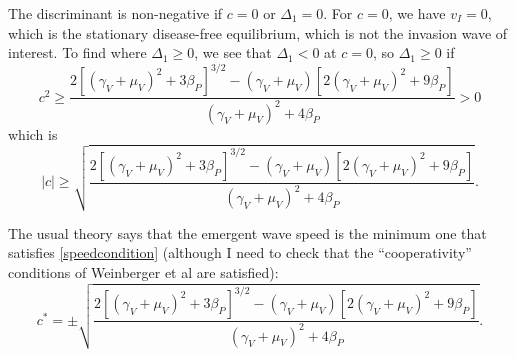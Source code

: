 \documentclass{article}
\begin{document}
The discriminant is non-negative if $c = 0$ or $\Delta_1 = 0$.  For
$c = 0$, we have $v_I = 0$, which is the stationary disease-free
equilibrium, which is not the invasion wave of interest.  To find
where $\Delta_1 \geq 0$, we see that $\Delta_1 < 0$ at $c = 0$, so
$\Delta_1 \geq 0$ if
\begin{equation}
  c^2 \geq 
  \frac{2 \left[(\gamma_V + \mu_V)^2 + 3 \beta_P\right]^{3/2}
    - (\gamma_V + \mu_V) \left[2 (\gamma_V + \mu_V)^2 + 9 \beta_P\right]}
  {(\gamma_V + \mu_V)^2 + 4 \beta_P}
  > 0
\end{equation}
which is
\begin{equation}
  \label{speedcondition}
  |c| \geq
  \sqrt{\frac{2 \left[(\gamma_V + \mu_V)^2 + 3 \beta_P\right]^{3/2}
      - (\gamma_V + \mu_V) \left[2 (\gamma_V + \mu_V)^2 + 9 \beta_P\right]}
    {(\gamma_V + \mu_V)^2 + 4 \beta_P}}.
\end{equation}

The usual theory says that the emergent wave speed is the minimum one
that satisfies \eqref{speedcondition} (although I need to check that the
``cooperativity'' conditions of Weinberger et al are satisfied):
\begin{equation}
  c^* = \pm \sqrt{\frac{2 \left[(\gamma_V + \mu_V)^2 + 3 \beta_P\right]^{3/2}
      - (\gamma_V + \mu_V) \left[2 (\gamma_V + \mu_V)^2 + 9 \beta_P\right]}
    {(\gamma_V + \mu_V)^2 + 4 \beta_P}}.
\end{equation}


\end{document}
